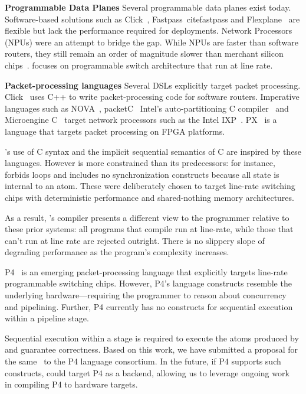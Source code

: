 \textbf{Programmable Data Planes}
Several programmable data planes exist today. Software-based solutions such as
Click~\cite{click}, Fastpass~cite{fastpass} and Flexplane~\cite{flexplane} are
flexible but lack the performance required for deployments. Network
Processors~\cite{intel, ixp2800, ixp} (NPUs) were an attempt to bridge the gap.
While NPUs are faster than software routers, they still remain an order of
magnitude slower than merchant silicon chips~\cite{rmt}. \pktlanguage focuses on
programmable switch architecture that run at line rate.

\textbf{Packet-processing languages}
Several DSLs explicitly target packet processing. Click~\cite{click} uses C++
to write packet-processing code for software routers. Imperative languages such
as NOVA~\cite{nova}, packetC~\cite{packetc} Intel's auto-partitioning C
compiler~\cite{intel_uiuc_pldi} and Microengine C~\cite{microenginec,
intel_ixa} target network processors such as the Intel IXP~\cite{ixp2800, ixp}.
PX~\cite{PX} is a language that targets packet processing on FPGA platforms.

\pktlanguage's use of C syntax and the implicit sequential semantics of C are
inspired by these languages. However \pktlanguage is more constrained than its
predecessors: for instance, \pktlanguage forbids loops and includes no
synchronization constructs because all state is internal to an atom. These were
deliberately chosen to target line-rate switching chips with deterministic
performance and shared-nothing memory architectures.

As a result, \pktlanguage's compiler presents a different view to the
programmer relative to these prior systems: all \pktlanguage programs that
compile run at line-rate, while those that can't run at line rate are rejected
outright. There is no slippery slope of degrading performance as the program's
complexity increases.

P4~\cite{p4} is an emerging packet-processing language that explicitly targets
line-rate programmable switching chips. However, P4's language constructs
resemble the underlying hardware---requiring the programmer to reason about
concurrency and pipelining. Further, P4 currently has no constructs for
sequential execution within a pipeline stage.

Sequential execution within a stage is required to execute the atoms produced
by \pktlanguage and guarantee correctness. Based on this work, we have
submitted a proposal for the same~\cite{p4-semantics} to the P4 language
consortium. In the future, if P4 supports such constructs, \pktlanguage could
target P4 as a backend, allowing us to leverage ongoing work ~\cite{netronome,
xilinx,lavanya_compiler} in compiling P4 to hardware targets.


